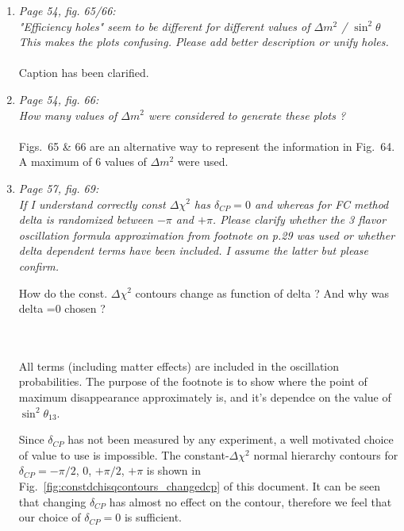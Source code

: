 \begin{enumerate}
  \vspace{5 mm}
\item
  {\em
    Page 54, fig. 65/66: \\
    "Efficiency holes" seem to be different for different values of $\Delta m^2$ / $\sin^2 \theta$ 
    This makes the plots confusing. Please add better description or unify holes.
  }\\
  \\
  Caption has been clarified.
  
  \vspace{5 mm}
\item
  {\em
    Page 54, fig. 66: \\
    How many values of $\Delta m^2$ were considered to generate these plots ?
  }\\
  \\
  Figs.\ 65 \& 66 are an alternative way to represent the information in Fig.\ 64.
  A maximum of 6 values of $\Delta m^2$ were used.
  
  \vspace{5 mm}
\item
  {\em
    Page 57, fig. 69:\\
    If I understand correctly const $\Delta \chi^2$ has $\delta_{CP}=0$ and whereas for FC method delta is randomized between $-\pi$ and $+\pi$.
    Please clarify whether the 3 flavor oscillation formula approximation from footnote on p.29 was used or whether delta dependent
    terms have been included. I assume the latter but please confirm.

    How do the const. $\Delta \chi^2$ contours change as function of delta ? 
    And why was delta =0 chosen ?  
  }\\
  \\
  All terms (including matter effects) are included in the oscillation probabilities.
  The purpose of the footnote is to show where the point of maximum disappearance approximately is,
  and it's dependce on the value of $\sin^2\theta_{13}$.

  Since $\delta_{CP}$ has not been measured by any experiment, a well motivated choice of value to use
  is impossible.
  The constant-$\Delta\chi^2$ normal hierarchy contours for
  $\delta_{CP} = -\pi/2$, 0, $+\pi/2$, $+\pi$
  is shown
  in Fig.\ \ref{fig:constdchisqcontours_changedcp} of this document.
  It can be seen that changing $\delta_{CP}$ has almost no effect on the contour,
  therefore we feel that our choice of $\delta_{CP} = 0$ is sufficient.


\end{enumerate}

